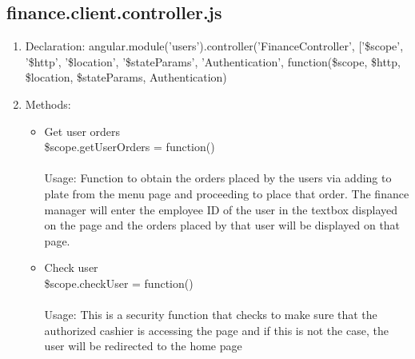 \documentclass[a4paper,12pt]{article}
\begin{document}
\subsection{finance.client.controller.js}
\begin{enumerate}
\item Declaration: angular.module('users').controller('FinanceController', ['\$scope', '\$http', '\$location', '\$stateParams', 'Authentication',
    function(\$scope, \$http, \$location, \$stateParams, Authentication)  
\item Methods:
	\begin{itemize}
		\item  Get user orders \\  \$scope.getUserOrders = function() 
		\\ \\ Usage: Function to obtain the orders placed by the users via adding to plate from the menu page and proceeding to place that order. The finance manager will enter the employee ID of the user in the textbox displayed on the page and the orders placed by that user will be displayed on that page.
		\item Check user \\ \$scope.checkUser = function() 
	\\ \\ Usage: This is a security function that checks to make sure that the authorized cashier is accessing the page and if this is not the case, the user will be redirected to the home page
	\end{itemize}	
\end{enumerate}
\end{document}
